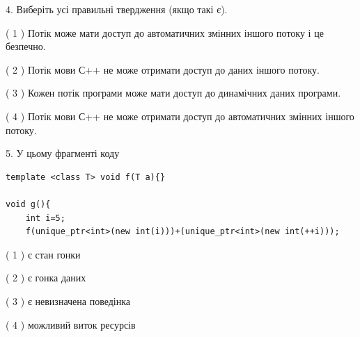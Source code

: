 \documentclass[12pt, ukrainian]{article}
\begin{document}
\begin {large}
{%
4. Виберіть усі правильні твердження (якщо такі є).\par
\vspace{2mm}

( 1 ) Потік може мати доступ до автоматичних змінних іншого потоку і це безпечно.%

( 2 ) Потік мови С++ не може отримати доступ до даних іншого потоку.%

( 3 ) Кожен потік програми може мати доступ до динамічних даних програми.%

( 4 ) Потік мови С++ не може отримати доступ до автоматичних змінних іншого потоку.%


5. У цьому фрагменті коду
\begin{verbatim}
template <class T> void f(T a){}

void g(){
    int i=5;
    f(unique_ptr<int>(new int(i)))+(unique_ptr<int>(new int(++i)));
\end{verbatim}
( 1 ) є стан гонки%

( 2 ) є гонка даних%

( 3 ) є невизначена поведінка%

( 4 ) можливий виток ресурсів%
}
\end {large}
\end{document}

